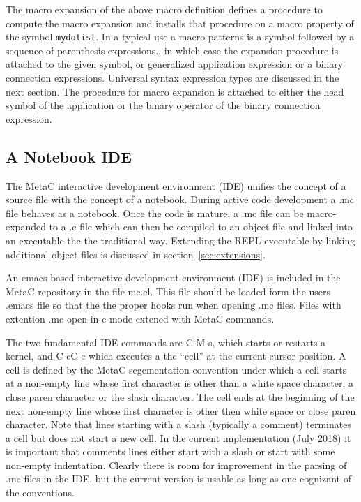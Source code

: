 \documentclass{article}
\begin{document}
The macro expansion of the above macro definition defines a procedure to compute the macro expansion and installs that procedure on a macro property of the symbol {\tt mydolist}.
In a typical use a macro patterns is a symbol followed by a sequence of parenthesis expressions., in which case the expansion procedure is attached to the given symbol,
or generalized application expression or a binary connection expressions.  Universal syntax expression types are discussed in the next section.
The procedure for macro expansion is attached to either the head symbol of the application
or the binary operator of the binary connection expression.

\subsection{A Notebook IDE}

The MetaC interactive development environment (IDE) unifies the concept of a source file with the concept of a notebook.
During active code development a .mc file behaves as a notebook. Once the code is mature, a .mc file can be macro-expanded to a .c
file which can then be compiled to an object file and linked into an executable the the traditional way.  Extending the REPL executable by linking additional object files
is discussed in section~\ref{sec:extensions}.

An emacs-based interactive development environment (IDE)
is included in the MetaC repository in the file mc.el.  This file should be loaded form the users .emacs file so that the the proper hooks run when opening .mc files.
Files with extention .mc open in c-mode extened with MetaC commands.

The two fundamental IDE commands are C-M-s, which starts or restarts a kernel, and C-cC-c which executes a the ``cell'' at the current cursor position.  A cell is defined
by the MetaC segementation convention under which a cell starts at a non-empty line whose first character is other than a white space character, a close paren character or
the slash character.  The cell ends at the beginning of the next non-empty line whose first character is other then white space or close paren character.  Note that lines starting
with a slash (typically a comment) terminates a cell but does not start a new cell.
In the current implementation (July 2018) it is important that comments lines either start with a slash or start with some non-empty indentation.
Clearly there is room for improvement in the parsing of .mc files in the IDE, but the current version is usable as long as one cognizant of the conventions.
\end{document}
